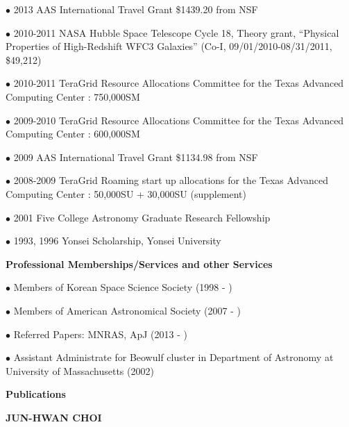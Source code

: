 \documentclass [11pt]{article}
\begin{document}
{\vspace{.02in}
\noindent
$\bullet$ 2013 AAS International Travel Grant \$1439.20 from NSF

\vspace{.02in}
\noindent
$\bullet$ 2010-2011 NASA Hubble Space Telescope Cycle 18, Theory grant, ``Physical Properties of High-Redshift WFC3 Galaxies'' (Co-I, 09/01/2010-08/31/2011, \$49,212)

\vspace{.02in}
\noindent
$\bullet$ 2010-2011 TeraGrid Resource Allocations Committee for the Texas Advanced Computing Center : 750,000SM

\vspace{.02in}
\noindent
$\bullet$ 2009-2010 TeraGrid Resource Allocations Committee for the Texas Advanced Computing Center : 600,000SM

\vspace{.02in}
\noindent
$\bullet$ 2009 AAS International Travel Grant \$1134.98 from NSF

\vspace{.02in}
\noindent
$\bullet$ 2008-2009 TeraGrid Roaming start up allocations for the Texas Advanced Computing Center : 50,000SU + 30,000SU (supplement)  

\vspace{.02in}
\noindent
$\bullet$ 2001 Five College Astronomy Graduate Research Fellowship

\vspace{.02in}
\noindent
$\bullet$ 1993, 1996 Yonsei Scholarship, Yonsei University


\vspace{.2in}
\noindent \textbf{Professional Memberships/Services and other Services}

\vspace{.02in}
\noindent
$\bullet$ Members of Korean Space Science Society (1998 - )

\noindent
$\bullet$ Members of American Astronomical Society (2007 - )

\noindent
$\bullet$ Referred Papers: MNRAS, ApJ (2013 - )

\noindent
$\bullet$ Assistant Administrate for Beowulf cluster in Department of Astronomy at University of Massachusetts (2002)


\newpage
\vspace{.25in}
{\centerline {\textbf{Publications}}}

\vspace{.1in}
{\centerline {\Large \textbf{JUN-HWAN CHOI}}

}}
\end{document}
